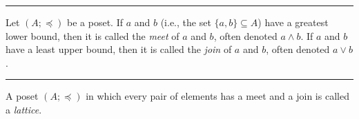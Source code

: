 \documentclass[a4paper]{extarticle}
\newcommand{\Com}{\textbf{Com.}\ }
\newcommand{\Ex}{\textbf{Example:}\ }
\DeclareMathOperator{\id}{\text{id}}
\newcommand{\sep}{\vspace{5pt}\noindent\hrule\vspace{5pt}}
\begin{document}
\begin{multicols*}{2}

\sep

 Let $(A;\preceq)$ be a poset. If $a$ and $b$ (i.e., the set
$\{a,b\}\subseteq A$) have a greatest lower bound, then it is called the
\emph{meet} of $a$ and $b$, often denoted $a \land b$. If $a$ and $b$ have a
least upper bound, then it is called the \emph{join} of $a$ and $b$, often
denoted $a \lor b$.

\sep

\Def[Lattice] A poset $(A;\preceq)$ in which every pair of elements has a meet
and a join is called a \emph{lattice}. 

\end{multicols*}
\end{document}
